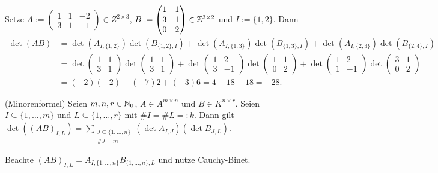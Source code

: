 \documentclass[../../main.tex]{subfiles}
\begin{document}
\begin{bsp}\label{17.2.7}
Setze $A:=\begin{pmatrix*}1&1&-2\\3&1&-1\end{pmatrix*}\in Z^{2\times 3}$, $B:=\begin{pmatrix*}1&1\\ 3&1\\ 0&2\end{pmatrix*}\in \Z^{3\times 2}$ und $I:=\{1,2\}$. Dann
\begin{align*}
\det(AB)&=\det(A_{I,\{1,2\}})\det(B_{\{1,2\},I})+\det(A_{I,\{1,3\}})\det(B_{\{1,3\},I})
+\det(A_{I,\{2,3\}})\det(B_{\{2,4\},I})\\
&=\det\begin{pmatrix*}1&1\\3&1\end{pmatrix*}\det\begin{pmatrix*}1&1\\3&1\end{pmatrix*}+\det\begin{pmatrix*}1&2\\3&-1\end{pmatrix*}\det\begin{pmatrix*}1&1\\0&2\end{pmatrix*}
+\det\begin{pmatrix*}1&2\\1&-1\end{pmatrix*}\det\begin{pmatrix*}3&1\\0&2\end{pmatrix*}\\
&=(-2)(-2)+(-7)2+(-3)6=4-18-18=-28.
\end{align*}
\end{bsp}

\begin{kor}\label{17.2.8}
(Minorenformel) Seien $m,n,r\in \mathbb N_0$, $A\in A^{m\times n}$ und $B\in K^{n\times r}$. Seien $I\subseteq\{1,\ldots ,m\}$ und $L\subseteq\{1,\ldots ,r\}$ mit $\# I=\#L=:k$. Dann gilt\\ $\det((AB)_{I,L})=\sum_{\substack{J\subseteq\{1,\ldots ,n\}\\\#J=m}}(\det A_{I,J})(\det B_{J,L})$.
\end{kor}
\begin{cproof}
Beachte $(AB)_{I,L}=A_{I,\{1,\ldots ,n\}}B_{\{1,\ldots ,n\},L}$ und nutze Cauchy-Binet.
\end{cproof}
\end{document}
